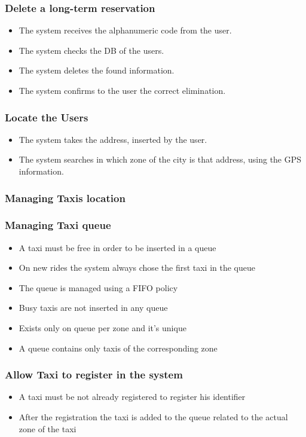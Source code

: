 		\subsubsection{Delete a long-term reservation}
		\begin{itemize}
		\item The system receives the alphanumeric code from the user.
		\item The system checks the DB of the users.
		\item The system deletes the found information.
		\item The system confirms to the user the correct elimination.
		\end{itemize}
		\subsubsection{Locate the Users}
		\begin{itemize}
		\item The system takes the address, inserted by the user.
		\item The system searches in which zone of the city is that address, using the GPS information.
		\end{itemize}		
		\subsubsection{Managing Taxis location}
		\subsubsection{Managing Taxi queue}
		\begin{itemize}
			\item A taxi must be free in order to be inserted in a queue
			\item On new rides the system always chose the first taxi in the queue
			\item The queue is managed using a FIFO policy
			\item Busy taxis are not inserted in any queue
			\item Exists only on queue per zone and it's unique
			\item A queue contains only taxis of the corresponding zone
		\end{itemize}
		\subsubsection{Allow Taxi to register in the system}
		\begin{itemize}
			\item A taxi must be not already registered to register his identifier
			\item After the registration the taxi is added to the queue related to the actual zone of the taxi
		\end{itemize}
